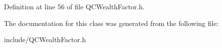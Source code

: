 Definition at line 56 of file Q\+C\+Wealth\+Factor.\+h.



The documentation for this class was generated from the following file\+:\begin{DoxyCompactItemize}
\item 
include/Q\+C\+Wealth\+Factor.\+h\end{DoxyCompactItemize}
